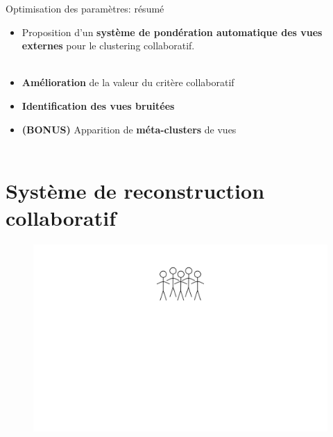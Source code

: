 \documentclass[hyperref={pdfpagelabels=false}]{beamer}
\begin{document}
    \begin{frame}{Optimisation des paramètres: résumé}
        \begin{itemize}
            \item Proposition d'un \textbf{système de pondération automatique 
                des vues externes} pour le clustering collaboratif.\\~\\
            \item \textbf{Amélioration} de la valeur du critère collaboratif
            \item \textbf{Identification des vues bruitées}
            \item \textbf{(BONUS)} Apparition de \textbf{méta-clusters} de 
                vues\\~\\
        \end{itemize}

        \begin{center}
            \fontsize{14pt}{15pt}
        \end{center}
    \end{frame}

    \section{Système de reconstruction collaboratif}
    \begin{frame}
        \begin{figure}[b]
            \centering
            \includegraphics[scale=.26]{idee_reconstruction_collaborative1}
        \end{figure}
    \end{frame}
\end{document}
